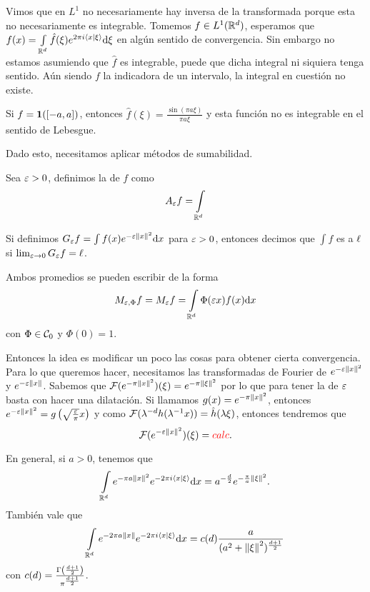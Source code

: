 \documentclass[12pt]{memoir}
\begin{document}
Vimos que en $L^1$ no necesariamente hay inversa de la transformada porque esta no necesariamente es integrable. Tomemos $f\in L^1(\mathbb{R}^d)$, esperamos que $f(x)=\int\limits_{\mathbb{R}^d}\hat{f}(\xi)e^{2\pi i\braket{x}{\xi}}\dd\xi$ en algún sentido de convergencia. Sin embargo no estamos asumiendo que $\hat{f}$ es integrable, puede que dicha integral ni siquiera tenga sentido. Aún siendo $f$ la indicadora de un intervalo, la integral en cuestión no existe.

\begin{Ex}
  Si $f=\mathbf{1}([-a,a])$, entonces $\hat{f}(\xi)=\frac{\sin(\pi a\xi)}{\pi a\xi}$ y esta función no es integrable en el sentido de Lebesgue.
\end{Ex}

Dado esto, necesitamos aplicar métodos de sumabilidad. 

\begin{Def}
  Sea $\varepsilon>0$, definimos la  de $f$ como 
  $$A_\varepsilon f=\int\limits_{\mathbb{R}^d}$$
\end{Def}

\begin{Def}
  Si definimos $G_\varepsilon f=\int f(x)e^{-\varepsilon\left\|x\right\|^2}\dd x$ para $\varepsilon>0$, entonces decimos que $\int f$ es  a $\ell$ si $\lim_{\varepsilon\to 0}G_\varepsilon f=\ell$.
\end{Def}

Ambos promedios se pueden escribir de la forma
$$M_{\varepsilon,\Phi}f=M_\varepsilon f=\int\limits_{\mathbb{R}^d}\Phi(\varepsilon x)f(x)\dd x$$
con $\Phi\in\mathcal{C}_0$ y $\Phi(0)=1$.

Entonces la idea es modificar un poco las cosas para obtener cierta convergencia. Para lo que queremos hacer, necesitamos las transformadas de Fourier de $e^{-\varepsilon\left\|x\right\|^2}$ y $e^{-\varepsilon\left\|x\right\|}$. Sabemos que $\mathcal{F}(e^{-\pi\left\|x\right\|^2})(\xi)=e^{-\pi\left\|\xi\right\|^2}$ por lo que para tener la de $\varepsilon$ basta con hacer una dilatación. Si llamamos $g(x)=e^{-\pi\left\|x\right\|^2}$, entonces $e^{-\varepsilon\left\|x\right\|^2}=g\left(\sqrt{\frac{\varepsilon}{\pi}}x\right)$ y como $\mathcal{F}(\lambda^{-d}h(\lambda^{-1}x))=\hat{h}(\lambda\xi)$, entonces tendremos que 
$$\mathcal{F}(e^{-\varepsilon\left\|x\right\|^2})(\xi)=\textcolor{red}{calc}.$$

\begin{Th}
  En general, si $a>0$, tenemos que 
  $$\int\limits_{\mathbb{R}^d}e^{-\pi a\left\|x\right\|^2}e^{-2\pi i\braket{x}{\xi}}\dd x=a^{-\frac{d}{2}}e^{-\frac{\pi}{a}\left\|\xi\right\|^2}.$$
  También vale que 
  $$\int\limits_{\mathbb{R}^d}e^{-2\pi a\left\|x\right\|}e^{-2\pi i\braket{x}{\xi}}\dd x=c(d)\frac{a}{(a^2+\left\|\xi\right\|^2)^{\frac{d+1}{2}}}$$
  con $c(d)=\frac{\Gamma\left(\frac{d+1}{2}\right)}{\pi^{\frac{d+1}{2}}}$.
\end{Th}
\end{document}
